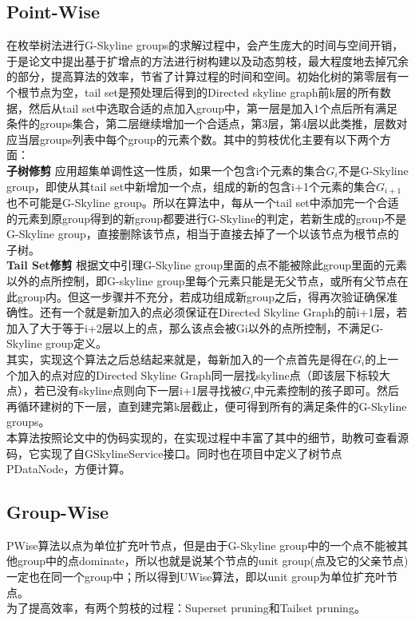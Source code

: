 \documentclass{article}
\begin{document}
\begin{CJK}{UTF8}{gbsn}
\subsection{Point-Wise}
在枚举树法进行G-Skyline groups的求解过程中，会产生庞大的时间与空间开销，于是论文中提出基于扩增点的方法进行树构建以及动态剪枝，最大程度地去掉冗余的部分，提高算法的效率，节省了计算过程的时间和空间。初始化树的第零层有一个根节点为空，tail set是预处理后得到的Directed skyline graph前k层的所有数据，然后从tail set中选取合适的点加入group中，第一层是加入1个点后所有满足条件的groups集合，第二层继续增加一个合适点，第3层，第4层以此类推，层数对应当层groups列表中每个group的元素个数。其中的剪枝优化主要有以下两个方面：\\
\textbf{子树修剪}
应用超集单调性这一性质，如果一个包含i个元素的集合$G_{i}$不是G-Skyline group，即使从其tail set中新增加一个点，组成的新的包含i+1个元素的集合$G_{i+1}$也不可能是G-Skyline group。所以在算法中，每从一个tail set中添加完一个合适的元素到原group得到的新group都要进行G-Skyline的判定，若新生成的group不是G-Skyline group，直接删除该节点，相当于直接去掉了一个以该节点为根节点的子树。\\
\textbf{Tail Set修剪}
根据文中引理G-Skyline group里面的点不能被除此group里面的元素以外的点所控制，即G-skyline group里每个元素只能是无父节点，或所有父节点在此group内。但这一步骤并不充分，若成功组成新group之后，得再次验证确保准确性。还有一个就是新加入的点必须保证在Directed Skyline Graph的前i+1层，若加入了大于等于i+2层以上的点，那么该点会被Gi以外的点所控制，不满足G-Skyline group定义。\\
其实，实现这个算法之后总结起来就是，每新加入的一个点首先是得在$G_{i}$的上一个加入的点对应的Directed Skyline Graph同一层找skyline点（即该层下标较大点），若已没有skyline点则向下一层i+1层寻找被$G_{i}$中元素控制的孩子即可。然后再循环建树的下一层，直到建完第k层截止，便可得到所有的满足条件的G-Skyline groups。\\
本算法按照论文中的伪码实现的，在实现过程中丰富了其中的细节，助教可查看源码，它实现了自GSkylineService接口。同时也在项目中定义了树节点PDataNode，方便计算。

\subsection{Group-Wise}
PWise算法以点为单位扩充叶节点，但是由于G-Skyline group中的一个点不能被其他group中的点dominate，所以也就是说某个节点的unit group(点及它的父亲节点)一定也在同一个group中；所以得到UWise算法，即以unit group为单位扩充叶节点。\\
为了提高效率，有两个剪枝的过程：Superset pruning和Tailset pruning。


\end{CJK}
\end{document}
